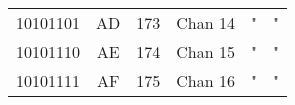 \begin{center}
\begin{supertabular}{| c | c | c | c | c | c |}
                10101101 & AD & 173 & Chan 14  &                   "                    &                    "                        \\
             10101110 & AE & 174 & Chan 15  &                   "                    &                    "                        \\
                10101111 & AF & 175 & Chan 16  &                   "                    &                    "                        \\
        \end{supertabular}
        \end{center}


